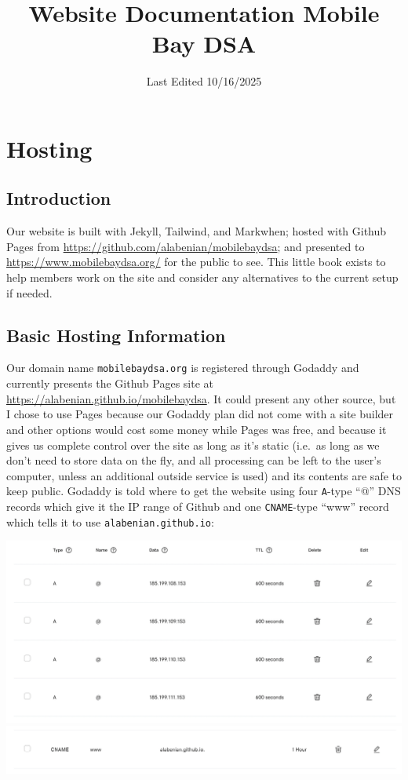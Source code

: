 \documentclass[
]{book}
\title{Website Documentation \textbar{} Mobile Bay DSA}
\author{}
\date{\vspace{-2.5em}Last Edited 10/16/2025}
\begin{document}
\maketitle

{
\setcounter{tocdepth}{1}
\tableofcontents
}
\part{Hosting}\label{part-hosting}

\chapter*{Introduction}\label{introduction}

Our website is built with Jekyll, Tailwind, and Markwhen; hosted with Github Pages from \url{https://github.com/alabenian/mobilebaydsa}; and presented to \url{https://www.mobilebaydsa.org/} for the public to see. This little book exists to help members work on the site and consider any alternatives to the current setup if needed.

\chapter{Basic Hosting Information}\label{basic-hosting-information}

Our domain name \texttt{mobilebaydsa.org} is registered through Godaddy and currently presents the Github Pages site at \url{https://alabenian.github.io/mobilebaydsa}. It could present any other source, but I chose to use Pages because our Godaddy plan did not come with a site builder and other options would cost some money while Pages was free, and because it gives us complete control over the site as long as it's static (i.e.~as long as we don't need to store data on the fly, and all processing can be left to the user's computer, unless an additional outside service is used) and its contents are safe to keep public. Godaddy is told where to get the website using four \texttt{A}-type ``@'' DNS records which give it the IP range of Github and one \texttt{CNAME}-type ``www'' record which tells it to use \texttt{alabenian.github.io}:

\includegraphics[width=1\linewidth,height=\textheight,keepaspectratio]{a-records.png}
\includegraphics[width=1\linewidth,height=\textheight,keepaspectratio]{cname-record.png}
\end{document}

